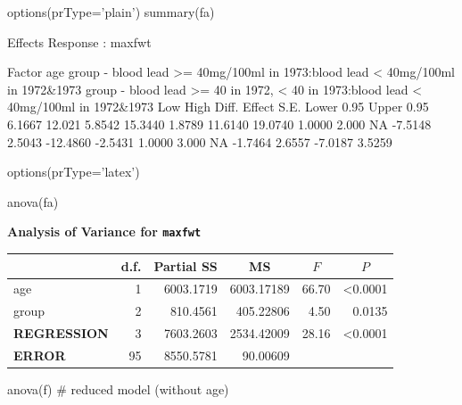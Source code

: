 \begin{Schunk}
\begin{Sinput}
options(prType='plain')
summary(fa)
\end{Sinput}
\begin{Soutput}
             Effects              Response : maxfwt 

 Factor                                                                             
 age                                                                                
 group - blood lead >= 40mg/100ml in 1973:blood lead < 40mg/100ml in 1972&1973      
 group - blood lead >= 40 in 1972, < 40 in 1973:blood lead < 40mg/100ml in 1972&1973
 Low    High   Diff.  Effect  S.E.   Lower 0.95 Upper 0.95
 6.1667 12.021 5.8542 15.3440 1.8789  11.6140   19.0740   
 1.0000  2.000     NA -7.5148 2.5043 -12.4860   -2.5431   
 1.0000  3.000     NA -1.7464 2.6557  -7.0187    3.5259   
\end{Soutput}
\begin{Sinput}
options(prType='latex')
\end{Sinput}
\end{Schunk}
\begin{Sinput}
anova(fa)
\end{Sinput}
\textbf{\Needspace{2in}
Analysis of Variance for \texttt{\smaller maxfwt}}\begin{center}
\begin{tabular}{lrrrrr}
\hline\hline
\multicolumn{1}{l}{}&\multicolumn{1}{c}{d.f.}&\multicolumn{1}{c}{Partial SS}&\multicolumn{1}{c}{MS}&\multicolumn{1}{c}{$F$}&\multicolumn{1}{c}{$P$}\tabularnewline
\hline
age& 1&6003.1719&6003.17189&66.70&\textless 0.0001\tabularnewline
group& 2& 810.4561& 405.22806& 4.50&0.0135\tabularnewline
\textbf{REGRESSION}& 3&7603.2603&2534.42009&28.16&\textless 0.0001\tabularnewline
\textbf{ERROR}&95&8550.5781&  90.00609&&\tabularnewline
\hline
\end{tabular}\end{center}
\begin{Sinput}
anova(f)    # reduced model (without age)
\end{Sinput}

